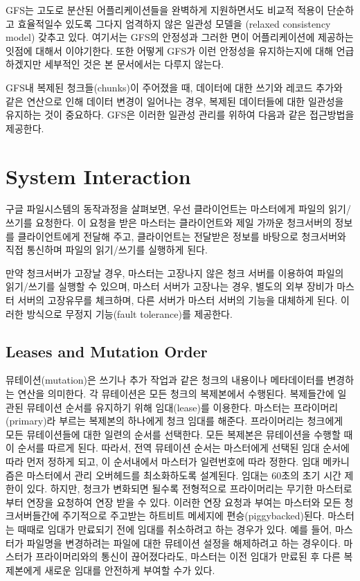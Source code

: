 \documentclass[twocolumn]{article}
\begin{document}
 GFS는  고도로 분산된 어플리케이션들을 완벽하게 지원하면서도 비교적 적용이 단순하고 효율적일수 있도록 그다지 엄격하지 않은 일관성 모델을 (relaxed consistency model) 갖추고 있다.  여기서는 GFS의 안정성과 그러한 면이 어플리케이션에 제공하는 잇점에 대해서 이야기한다.  또한 어떻게 GFS가 이런 안정성을 유지하는지에 대해 언급하겠지만 세부적인 것은 본 문서에서는 다루지 않는다.

GFS내 복제된 청크들(chunks)이 주어졌을 때, 데이터에 대한 쓰기와 레코드 추가와 같은 연산으로 인해 데이터 변경이 일어나는 경우,  복제된 데이터들에 대한 일관성을 유지하는 것이 중요하다. GFS은 이러한 일관성 관리를 위하여 다음과 같은 접근방법을 제공한다.

\section{System Interaction}
구글 파일시스템의 동작과정을 살펴보면, 우선 클라이언트는 마스터에게 파일의 읽기/쓰기를 요청한다. 이 요청을 받은 마스터는 클라이언트와 제일 가까운 청크서버의 정보를 클라이언트에게 전달해 주고, 클라이언트는 전달받은 정보를 바탕으로 청크서버와 직접 통신하며 파일의 읽기/쓰기를 실행하게 된다.

만약 청크서버가 고장날 경우, 마스터는 고장나지 않은 청크 서버를 이용하여 파일의 읽기/쓰기를 실행할 수 있으며, 마스터 서버가 고장나는 경우, 별도의 외부 장비가 마스터 서버의 고장유무를 체크하며, 다른 서버가 마스터 서버의 기능을 대체하게 된다. 이러한 방식으로 무정지 기능(fault tolerance)를 제공한다.

\subsection{Leases and Mutation Order}
뮤테이션(mutation)은 쓰기나 추가 작업과 같은 청크의 내용이나 메타데이터를 변경하는 연산을 의미한다.
각 뮤테이션은 모든 청크의 복제본에서 수행된다.
복제들간에 일관된 뮤테이션 순서를 유지하기 위해 임대(lease)를 이용한다.
마스터는 프라이머리(primary)라 부르는 복제본의 하나에게 청크 임대를 해준다.
프라이머리는 청크에게 모든 뮤테이션들에 대한 일련의 순서를 선택한다.
모든 복제본은 뮤테이션을 수행할 때 이 순서를 따르게 된다.
따라서, 전역 뮤테이션 순서는 마스터에게 선택된 임대 순서에 따라 먼저 정하게 되고, 이 순서내에서 마스터가 일련번호에 따라 정한다.
임대 메카니즘은 마스터에서 관리 오버헤드를 최소화하도록 설계된다.
임대는 60초의 초기 시간 제한이 있다.
하지만,  청크가 변화되면 될수록 전형적으로 프라이머리는 무기한 마스터로부터 연장을 요청하여 연장 받을 수 있다.
이러한 연장 요청과 부여는 마스터와 모든 청크서버들간에 주기적으로 주고받는 하트비트 메세지에 편승(piggybacked)된다.
마스터는 때때로 임대가 만료되기 전에 임대를 취소하려고 하는 경우가 있다. 예를 들어, 마스터가 파일명을 변경하려는 파일에 대한 뮤테이션 설정을 해제하려고 하는 경우이다.
마스터가 프라이머리와의 통신이 끊어졌다라도, 마스터는 이전 임대가 만료된 후 다른 복제본에게 새로운 임대를 안전하게 부여할 수가 있다.
\end{document}
